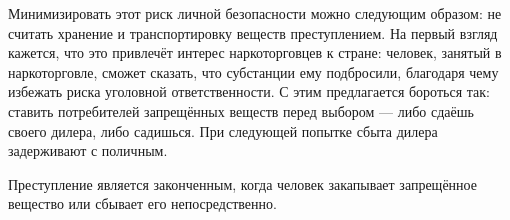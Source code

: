 \documentclass[11pt]{article}
\theoremstyle{remark}
\theoremstyle{definition}
\begin{document}
Минимизировать этот риск личной безопасности можно следующим образом: не считать хранение и транспортировку веществ преступлением. На первый взгляд кажется, что это привлечёт интерес наркоторговцев к стране: человек, занятый в наркоторговле, сможет сказать, что субстанции ему подбросили, благодаря чему избежать риска уголовной ответственности. С этим предлагается бороться так: ставить потребителей запрещённых веществ перед выбором --- либо сдаёшь своего дилера, либо садишься. При следующей попытке сбыта дилера задерживают с поличным.








 


Преступление является законченным, когда человек закапывает запрещённое вещество или сбывает его непосредственно.






\end{document}
